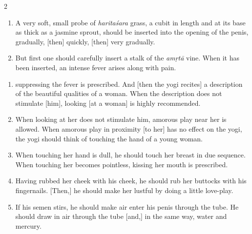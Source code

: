 \begin{nohyp} 
\begin{multicols}{2}
\begin{eng}
\begin{enumerate}[nosep]
\item[18.] A very soft, small probe of \textit{haritaśara} grass, a cubit in length and at its base as thick as a jasmine sprout, should be inserted into the opening of the penis, gradually, [then] quickly, [then] very gradually.
\item[19.] But first one should carefully insert a stalk of the \textit{amṛtā} vine. When it has been inserted, an intense fever arises along with pain.
\end{enumerate}
\vskip 7pt

\vskip 7pt


\begin{enumerate}[nosep]
\item[20.] [In Koraṇṭaka\index{Korantaka@Koraṇṭaka}’s tradition,] suppressing the fever is prescribed. And [then the yogi recites] a description of the beautiful qualities of a woman. When the description does not stimulate [him],  looking [at a woman] is highly recommended. 
\item[21.] When looking at her does not stimulate him, amorous play near her is allowed. When amorous play in proximity [to her] has no effect on the yogi, the yogi should think of touching the hand of a young woman.
\item[22.] When touching her hand is dull, he should touch her breast in due sequence. When touching her becomes pointless, kissing her mouth is prescribed.
\item[23.] Having rubbed her cheek with his cheek, he should rub her buttocks with his fingernails. [Then,] he should make her lustful by doing a little love-play.
\item[24.] If his semen stirs, he should make air enter his penis through the tube. He should draw in air through the tube [and,] in the same way, water and mercury.
\end{enumerate}
\vskip 7pt


\end{eng}
\end{multicols}
\end{nohyp}
